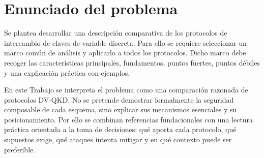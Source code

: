 \chapter{Enunciado del problema}

Se plantea desarrollar una descripción comparativa de los protocolos de intercambio de claves de variable discreta. Para ello se requiere seleccionar un marco común de análisis y aplicarlo a todos los protocolos. Dicho marco debe recoger las características principales, fundamentos, puntos fuertes, puntos débiles y una explicación práctica con ejemplos.

En este Trabajo se interpreta el problema como una comparación razonada de protocolos DV-QKD. No se pretende demostrar formalmente la seguridad composable de cada esquema, sino explicar sus mecanismos esenciales y su posicionamiento. Por ello se combinan referencias fundacionales con una lectura práctica orientada a la toma de decisiones: qué aporta cada protocolo, qué supuestos exige, qué ataques intenta mitigar y en qué contexto puede ser preferible.